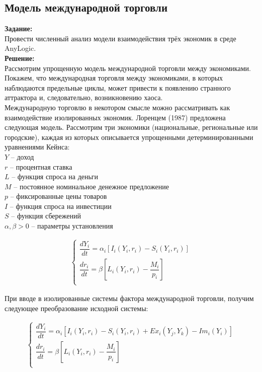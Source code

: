 \subsection*{Модель международной торговли}

\textbf{Задание:}\\
Провести численный анализ модели взаимодействия трёх экономик в среде AnyLogic.\\

\textbf{Решение:}\\
Рассмотрим упрощенную модель международной торговли между экономиками. Покажем, что международная торговля между экономиками, в которых наблюдаются предельные циклы, может привести к появлению странного аттрактора и, следовательно, возникновению хаоса.\\

Международную торговлю в некотором смысле можно рассматривать как взаимодействие изолированных экономик. Лоренцем (1987) предложена следующая модель. Рассмотрим три экономики (национальные, региональные или городские), каждая из которых описывается упрощенными детерминированными уравнениями Кейнса:\\

$Y$ -- доход\\
$r$ -- процентная ставка\\
$L$ -- функция спроса на деньги\\
$M$ -- постоянное номинальное денежное предложение\\
$p$ -- фиксированные цены товаров\\
$I$ -- функция спроса на инвестиции\\
$S$ -- функция сбережений\\
$\alpha, \beta > 0$ -- параметры установления

\begin{align*}
	\begin{cases}
		\dfrac{dY_i}{dt} = \alpha_i [I_i(Y_i, r_i) - S_i(Y_i, r_i)]\\[10pt]
		\dfrac{dr_i}{dt} = \beta \left[L_i(Y_i, r_i) - \dfrac{M_i}{p_i}\right]\\
	\end{cases}
\end{align*}

При вводе в изолированные системы фактора международной торговли, получим следующее преобразование исходной системы:

\begin{align*}
	\begin{cases}
		\dfrac{dY_i}{dt} = \alpha_i [I_i(Y_i, r_i) - S_i(Y_i, r_i) + Ex_i(Y_j, Y_k) - Im_i(Y_i)]\\[10pt]
		\dfrac{dr_i}{dt} = \beta \left[L_i(Y_i, r_i) - \dfrac{M_i}{p_i}\right]\\
	\end{cases}
\end{align*}

